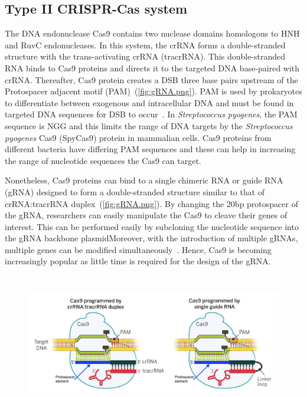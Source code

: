 \documentclass[11pt]{article}
\begin{document}
\subsection{Type II CRISPR-Cas system}
The DNA endonuclease Cas9 contains two nuclease domains homologous to HNH and RuvC endonucleases. In this system, the crRNA forms a double-stranded structure with the trans-activating crRNA (tracrRNA). This double-stranded RNA binds to Cas9 proteins and directs it to the targeted DNA base-paired with crRNA. Thereafter, Cas9 protein creates a DSB three base pairs upstream of the Protospacer adjacent motif (PAM)~(\autoref{fig:gRNA.png}). PAM is used by prokaryotes to differentiate between exogenous and intracellular DNA and must be found in targeted DNA sequences for DSB to occur~\citep{Jinek2012a}. In \textit{Streptococcus pyogenes}, the PAM sequence is NGG and this limits the range of DNA targets by the \textit{Streptococcus pyogenes} Cas9 (SpyCas9) protein in mammalian cells. Cas9 proteins from different bacteria have differing PAM sequences and these can help in increasing the range of nucleotide sequences the Cas9 can target. ~\citep{Hou2013a}

Nonetheless, Cas9 proteins can bind to a single chimeric RNA or guide RNA (gRNA) designed to form a double-stranded structure similar to that of crRNA:tracrRNA duplex~(\autoref{fig:gRNA.png}). By changing the 20bp protospacer of the gRNA, researchers can easily manipulate the Cas9 to cleave their genes of interest. This can be performed easily by subcloning the nucleotide sequence into the gRNA backbone plasmidMoreover, with the introduction of multiple gRNAs, multiple genes can be modified simultaneously~\citep{Jinek2012a}. Hence, Cas9 is becoming increasingly popular as little time is required for the design of the gRNA.

\begin{figure}[H]
  \centering
    \includegraphics[width=\textwidth, height = 60mm]{gRNA.png}
    \label{fig:gRNA.png}
\end{figure}
\end{document}

